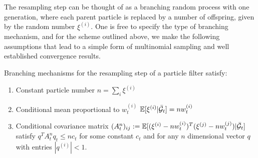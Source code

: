 The resampling step can be thought of as a branching random process with one generation, where each parent particle is replaced by a number of offspring, given by the random number $\xi^{(i)}$. One is free to specify the type of branching mechanism, and for the scheme outlined above, we make the following assumptions that lead to a simple form of multinomial sampling and well established convergence results. 
\begin{proposition} \label{prop:banchingproperties}
	Branching mechanisms for the resampling step of a particle filter satisfy:
	\begin{enumerate}
		\item Constant particle number $n = \sum_i \xi^{(i)}$
		\item Conditional mean proportional to $w_t^{(i)}$ $\mathbb{E}[ \xi^{(i)} | \bar{\mathcal{G}}_t ] = n w_t^{(i)}$
		\item Conditional covariance matrix $(A^n_t)_{ij} := \mathbb{E}[(\xi^{(i)} - n w_t^{(i)})^T (\xi^{(j)} - n w_t^{(j)}) | \bar{\mathcal{G}}_t ]$ satisfy $q^T A^n_t q_t \leq nc_t$ for some constant $c_t$ and for any $n$ dimensional vector $q$ with entries  $|q^{(i)} |< 1$.
	\end{enumerate}
\end{proposition}

